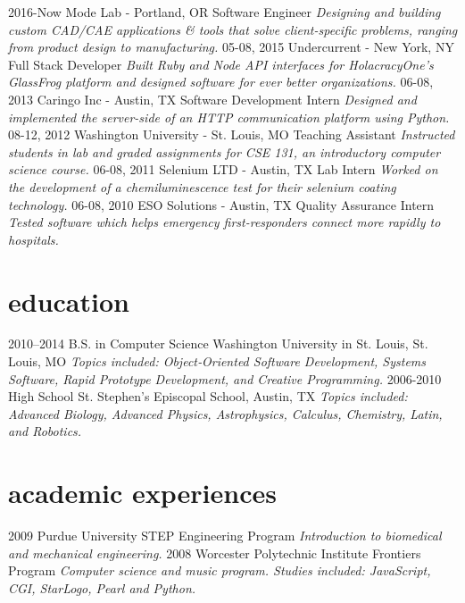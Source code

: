 \documentclass[]{cv}
\begin{document}
\begin{entrylist}
  \entry
    {2016-Now}
    {Mode Lab - Portland, OR}
    {Software Engineer}
    {\emph{Designing and building custom CAD/CAE applications \& tools that solve client-specific problems, ranging from product design to manufacturing.}}
  \entry
    {05-08, 2015}
    {Undercurrent - New York, NY}
    {Full Stack Developer}
    {\emph{Built Ruby and Node API interfaces for HolacracyOne's GlassFrog platform and designed software for ever better organizations.}}
  \entry
    {06-08, 2013}
    {Caringo Inc - Austin, TX}
    {Software Development Intern}
    {\emph{Designed and implemented the server-side of an HTTP communication platform using Python.}}
  \entry
    {08-12, 2012}
    {Washington University - St. Louis, MO}
    {Teaching Assistant}
    {\emph{Instructed students in lab and graded assignments for CSE 131, an introductory computer science course.}}
  \entry
    {06-08, 2011}
    {Selenium LTD - Austin, TX}
    {Lab Intern}
    {\emph{Worked on the development of a chemiluminescence test for their selenium coating technology.}}
  \entry
    {06-08, 2010}
    {ESO Solutions - Austin, TX}
    {Quality Assurance Intern}
    {\emph{Tested software which helps emergency first-responders connect more rapidly to hospitals.}}
\end{entrylist}

\section{education}

\begin{entrylist}
  \entry
    {2010–2014}
    {B.S. in Computer Science}
    {Washington University in St. Louis, St. Louis, MO}
    {\emph{Topics included: Object‐Oriented Software Development, Systems Software, Rapid Prototype Development, and Creative Programming.}}
  \entry
    {2006-2010}
    {High School}
    {St. Stephen’s Episcopal School, Austin, TX}
    {\emph{Topics included: Advanced Biology, Advanced Physics, Astrophysics, Calculus, Chemistry, Latin, and Robotics.}}
\end{entrylist}

\section{academic experiences}

\begin{entrylist}
  \entry
    {2009}
    {Purdue University STEP Engineering Program}{}
    {\emph{Introduction to biomedical and mechanical engineering.}}
  \entry
    {2008}
    {Worcester Polytechnic Institute Frontiers Program}{}
    {\emph{Computer science and music program. Studies included: JavaScript, CGI, StarLogo, Pearl and Python.}}
\end{entrylist}
\end{document}
